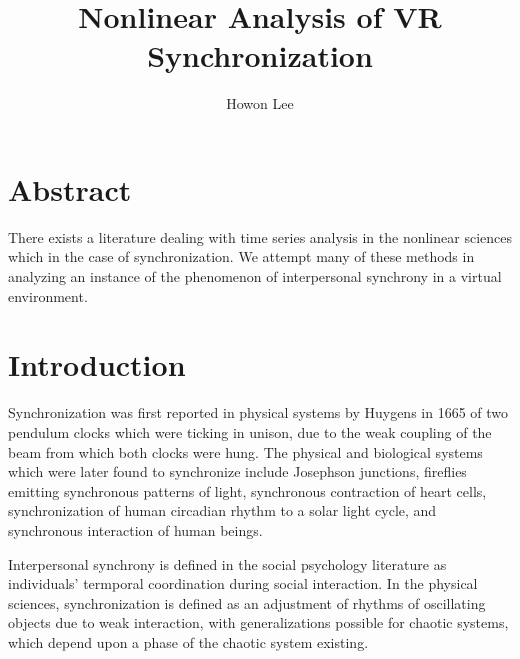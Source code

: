 \documentclass[12pt]{article}
\begin{document}
\title{Nonlinear Analysis of VR Synchronization}
\author{Howon Lee}
\maketitle

\section{Abstract}
There exists a literature dealing with time series analysis in the nonlinear sciences which in the case of synchronization. We attempt many of these methods in analyzing an instance of the phenomenon of interpersonal synchrony in a virtual environment.%


\section{Introduction}

Synchronization was first reported in physical systems by Huygens in 1665 of two pendulum clocks which were ticking in unison, due to the weak coupling of the beam from which both clocks were hung. The physical and biological systems which were later found to synchronize include Josephson junctions, fireflies emitting synchronous patterns of light, synchronous contraction of heart cells, synchronization of human circadian rhythm to a solar light cycle, and synchronous interaction of human beings. %

Interpersonal synchrony is defined in the social psychology literature as individuals' termporal coordination during social interaction. In the physical sciences, synchronization is defined as an adjustment of rhythms of oscillating objects due to weak interaction, with generalizations possible for chaotic systems, which depend upon a phase of the chaotic system existing. %

\end{document}
